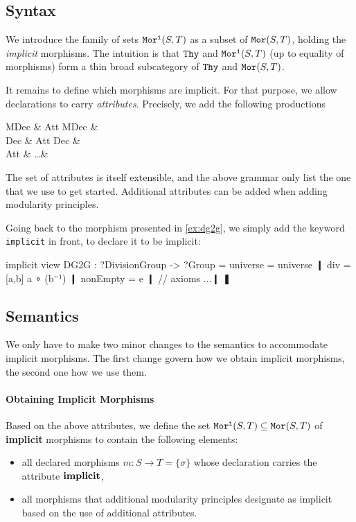 
\subsection{Syntax}

We introduce the family of sets $\mathtt{Mor^i}(S,T)$ as a subset of $\mathtt{Mor}(S,T)$, holding the \textit{implicit} morphisms.
The intuition is that $\mathtt{Thy}$ and $\mathtt{Mor^i}(S,T)$ (up to equality of morphisms) form a thin broad subcategory of $\mathtt{Thy}$ and $\mathtt{Mor}(S,T)$.

It remains to define which morphisms are implicit.
For that purpose, we allow \mmt declarations to carry \textit{attributes}.
Precisely, we add the following productions
\begin{grammar}
MDec   & Att\; MDec  &  \\
Dec    & Att\; Dec   & \\
Att    &  \alt \ldots & 
\end{grammar}

The set of attributes is itself extensible, and the above grammar only list the one that we use to get started.
Additional attributes can be added when adding modularity principles.

\begin{example}\label{ex:dg2gimplicit}
Going back to the morphism presented in \autoref{ex:dg2g}, we simply add the keyword \lstinline|implicit| in front, to declare it to be implicit:
\begin{mmtcode}
implicit view DG2G : ?DivisionGroup -> ?Group =
  universe = universe ❙
  div = [a,b] a ∘ (b⁻¹) ❙
  nonEmpty = e ❙
  // axioms ...❙
❚
\end{mmtcode}
\end{example}

\subsection{Semantics}

We only have to make two minor changes to the semantics to accommodate implicit morphisms.
The first change govern how we obtain implicit morphisms, the second one how we use them.

\paragraph{Obtaining Implicit Morphisms}
Based on the above attributes, we define the set $\mathtt{Mor^i}(S,T)\subseteq\mathtt{Mor}(S,T)$ of \textbf{implicit} morphisms to contain the following elements:
\begin{itemize}
 \item all declared morphisms $m:S\to T=\{\sigma\}$ whose declaration carries the attribute $\operatorname{\mathbf{implicit}}$,
 \item all morphisms that additional modularity principles designate as implicit based on the use of additional attributes.
\end{itemize}

